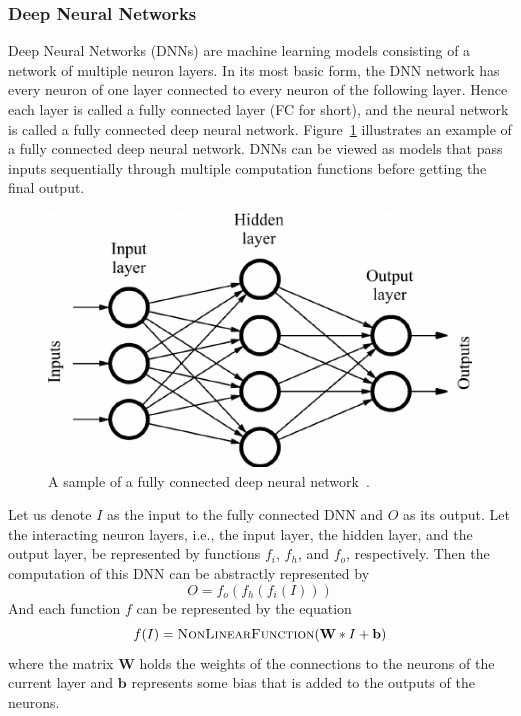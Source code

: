 \documentclass[12pt, twoside, ngerman]{report}
\begin{document}

\subsubsection{Deep Neural Networks}
Deep Neural Networks (DNNs) are machine learning models consisting of a network of multiple neuron layers.
In its most basic form, the DNN network has every neuron of one layer connected to every neuron of the following layer.
Hence each layer is called a fully connected layer (FC for short), and the neural network is called a fully connected deep neural network.
Figure~\ref{fig:DeepNeuralNetwork} illustrates an example of a fully connected deep neural network.
DNNs can be viewed as models that pass inputs sequentially through multiple computation functions before getting the final output.

\begin{figure}[h]
  \centering
    \includegraphics[scale=0.5]{images/DeepNeuralNetwork}
    \caption{A sample of a fully connected deep neural network~\cite{deepNeuralNetworksImage}.}
    \label{fig:DeepNeuralNetwork}
\end{figure}

Let us denote $I$ as the input to the fully connected DNN and $O$ as its output.
Let the interacting neuron layers, i.e., the input layer, the hidden layer, and the output layer, be represented by functions $f_i$, $f_h$, and $f_o$, respectively.
Then the computation of this DNN can be abstractly represented by
\begin{equation}
O = f_o(f_h(f_i(I)))
\end{equation}
And each function $f$ can be represented by the equation
\begin{equation}
f(I) = \textsc{NonLinearFunction}(\textbf{W} * I + \textbf{b})
\end{equation}
where the matrix $\textbf{W}$  holds the weights of the connections to the neurons of the current layer and $\textbf{b}$ represents some bias that is added to the outputs of the neurons.
\end{document}
